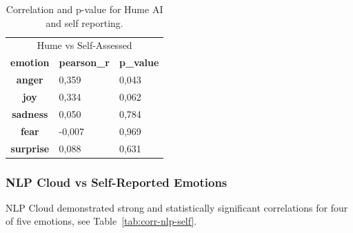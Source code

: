 \begin{table}[!h]
    \centering
    \begin{tabular}{cll}
    \multicolumn{3}{c}{\cellcolor[HTML]{C0C0C0}Hume vs Self-Assessed}                                                        \\
    \multicolumn{1}{c|}{\textbf{emotion}}  & \multicolumn{1}{c}{\textbf{pearson\_r}} & \multicolumn{1}{c}{\textbf{p\_value}} \\ \hline
    \multicolumn{1}{c|}{\textbf{anger}}    & 0,359                                   & 0,043                                 \\
    \multicolumn{1}{c|}{\textbf{joy}}      & 0,334                                   & 0,062                                 \\
    \multicolumn{1}{c|}{\textbf{sadness}}  & 0,050                                   & 0,784                                 \\
    \multicolumn{1}{c|}{\textbf{fear}}     & -0,007                                  & 0,969                                 \\
    \multicolumn{1}{c|}{\textbf{surprise}} & 0,088                                   & 0,631                                
    \end{tabular}
    \caption{Correlation and p-value for Hume AI and self reporting.}
    \label{tab:corr-hume-self}
\end{table}

\subsubsection{NLP Cloud vs Self-Reported Emotions}
\label{sec:nlp-self}
NLP Cloud demonstrated strong and statistically significant correlations for four of five emotions, see 
Table~\ref{tab:corr-nlp-self}. 

